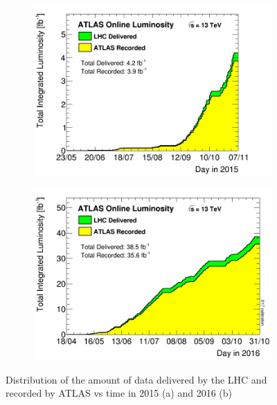\begin{figure}[htb]
  \begin{center}
    \begin{subfigure}[a]{0.45\textwidth}
        \includegraphics[width=\textwidth]{figures/Data/IntLumi2015.png}\hspace{0.05\textwidth}
                \caption{ }
    \end{subfigure}
    \begin{subfigure}[b]{0.45\textwidth}
        \includegraphics[width=\textwidth]{figures/Data/IntLumi2016.png}\hspace{0.05\textwidth}
                \caption{ }
    \end{subfigure}
\end{center}
\caption{Distribution of the amount of data delivered by the LHC and recorded by ATLAS vs time in 2015 (a) and 2016 (b) }
\label{fig:data2015-2016} 
\end{figure}

